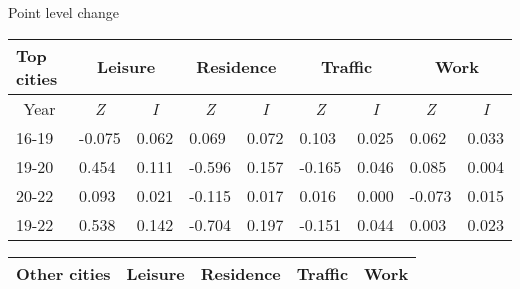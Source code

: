 \documentclass[aspectratio=169,xcolor=dvipsnames]{beamer}
\begin{document}
\begin{frame}{Point level change}
	\small 
\begin{table}[]
	\begin{tabular}{lllllllll}\hline 
	Top cities	& \multicolumn{2}{c}{Leisure}                                     & \multicolumn{2}{c}{Residence}                                   & \multicolumn{2}{c}{Traffic}                                     & \multicolumn{2}{c}{Work}                                        \\\hline 
		\multicolumn{1}{c}{Year} & \multicolumn{1}{c}{\textit{Z}} & \multicolumn{1}{c}{\textit{I}} & \multicolumn{1}{c}{\textit{Z}} & \multicolumn{1}{c}{\textit{I}} & \multicolumn{1}{c}{\textit{Z}} & \multicolumn{1}{c}{\textit{I}} & \multicolumn{1}{c}{\textit{Z}} & \multicolumn{1}{c}{\textit{I}} \\\hline 
		16-19                    & -0.075                         & 0.062                          & 0.069                          & 0.072                          & 0.103                          & 0.025                          & 0.062                          & 0.033                          \\
		19-20                    & 0.454                          & 0.111                          & -0.596                         & 0.157                          & -0.165                         & 0.046                          & 0.085                          & 0.004                          \\
		20-22                    & 0.093                          & 0.021                          & -0.115                         & 0.017                          & 0.016                          & 0.000                          & -0.073                         & 0.015                          \\
		19-22                    & 0.538                          & 0.142                          & -0.704                         & 0.197                          & -0.151                         & 0.044                          & 0.003                          & 0.023                         \\\bottomrule
	\end{tabular}\vspace{0.5em}
	\begin{tabular}{lllllllll}\hline 
	Other cities& \multicolumn{2}{c}{Leisure}                                     & \multicolumn{2}{c}{Residence}                                   & \multicolumn{2}{c}{Traffic}                                     & \multicolumn{2}{c}{Work}                                        \\\hline 

\end{tabular}
\end{table}
\end{frame}
\end{document}

